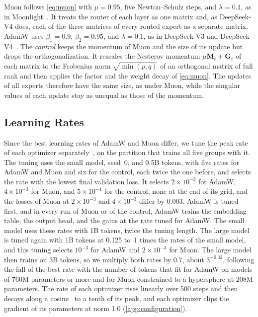 \documentclass[11pt, a4paper]{article}
\begin{document}
Muon follows \cref{eq:muon} with $\mu = 0.95$, five Newton--Schulz steps, and $\lambda = 0.1$, as in Moonlight~\citep{liu2025moonlight}. It treats the router of each layer as one matrix and, as DeepSeek-V4 does, each of the three matrices of every routed expert as a separate matrix. AdamW uses $\beta_1 = 0.9$, $\beta_2 = 0.95$, and $\lambda = 0.1$, as in DeepSeek-V3 and DeepSeek-V4~\citep{deepseek2024v3, deepseek2026v4}. The \emph{control} keeps the momentum of Muon and the size of its update but drops the orthogonalization. It rescales the Nesterov momentum $\mu \mathbf{M}_t + \mathbf{G}_t$ of each matrix to the Frobenius norm $\sqrt{\min(p, q)}$ of an orthogonal matrix of full rank and then applies the factor and the weight decay of \cref{eq:muon}. The updates of all experts therefore have the same size, as under Muon, while the singular values of each update stay as unequal as those of the momentum.

\subsection{Learning Rates}
\label{sec:rates}

Since the best learning rates of AdamW and Muon differ, we tune the peak rate of each optimizer separately~\citep{wen2025fantastic, semenov2025benchmarking}, on the partition that trains all five groups with it. The tuning uses the small model, seed~0, and 0.5B tokens, with five rates for AdamW and Muon and six for the control, each twice the one before, and selects the rate with the lowest final validation loss. It selects $2 \times 10^{-3}$ for AdamW, $4 \times 10^{-3}$ for Muon, and $5 \times 10^{-4}$ for the control, none at the end of its grid, and the losses of Muon at $2 \times 10^{-3}$ and $4 \times 10^{-3}$ differ by 0.003. AdamW is tuned first, and in every run of Muon or of the control, AdamW trains the embedding table, the output head, and the gains at the rate tuned for AdamW\@. The small model uses these rates with 1B tokens, twice the tuning length. The large model is tuned again with 1B tokens at 0.125 to~1 times the rates of the small model, and this tuning selects $10^{-3}$ for AdamW and $2 \times 10^{-3}$ for Muon. The large model then trains on 3B tokens, so we multiply both rates by 0.7, about $3^{-0.32}$, following the fall of the best rate with the number of tokens that \citet{bjorck2025horizons} fit for AdamW on models of 760M parameters or more and \citet{ren2026hypersphere} for Muon constrained to a hypersphere at 208M parameters. The rate of each optimizer rises linearly over 500 steps and then decays along a cosine~\citep{loshchilov2017sgdr} to a tenth of its peak, and each optimizer clips the gradient of its parameters at norm 1.0 (\cref{app:configuration}).
\end{document}

